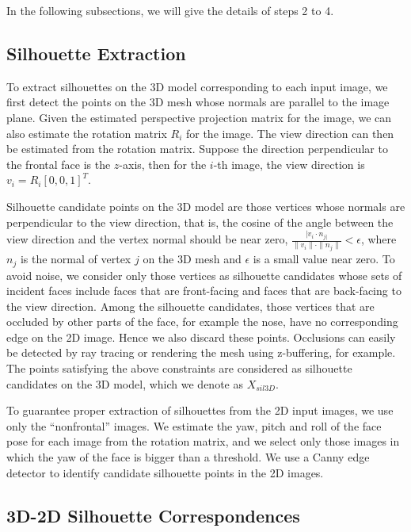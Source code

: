 In the following subsections, we will give the details of steps 2 to 4.

\subsection{Silhouette Extraction}

To extract silhouettes on the 3D model corresponding to each input image, we first detect the points on the 3D mesh whose normals are parallel to the image plane. Given the estimated perspective projection matrix for the image, we can also estimate the rotation matrix $R_{i}$ for the image. The view direction can then be estimated from the rotation matrix. Suppose the direction perpendicular to the frontal face is the $z$-axis, then for the $i$-th image, the view direction is $v_{i}=R_{i} \left[ 0,  0,  1 \right]^T$. 

Silhouette candidate points on the 3D model are those vertices whose normals are perpendicular to the view direction, that is, the cosine of the angle between the view direction and the vertex normal should be near zero, $\frac {|v_{i} \cdot n_{j|}} {\|v_{i} \| \cdot \|n_{j} \|} < \epsilon$, where $n_{j}$ is the normal of vertex $j$ on the 3D mesh and $\epsilon$ is a small value near zero. To avoid noise, we consider only those vertices as silhouette candidates whose sets of incident faces include faces that are front-facing and faces that are back-facing to the view direction. Among the silhouette candidates, those vertices that are occluded by other parts of the face, for example the nose, have no corresponding edge on the 2D image. Hence we also discard these points. Occlusions can easily be detected by ray tracing or rendering the mesh using z-buffering, for example. The points satisfying the above constraints are considered as silhouette candidates on the 3D model, which we denote as $X_{sil3D}$.

To guarantee proper extraction of silhouettes from the 2D input images, we use only the ``nonfrontal'' images. We estimate the yaw, pitch and roll of the face pose for each image from the rotation matrix, and we select only those images in which the yaw of the face is bigger than a threshold. We use a Canny edge detector \cite{Canny86} to identify candidate silhouette points in the 2D images.


\subsection{3D-2D Silhouette Correspondences}
\label{sec:correspondences}

